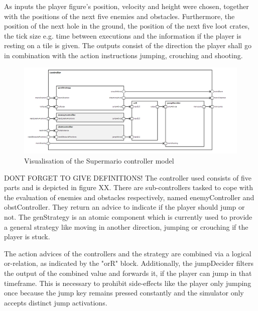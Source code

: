As inputs the player figure's position, velocity and height were chosen, together with the positions of the next five enemies and obstacles. Furthermore, the position of the next hole in the ground, the position of the next five loot crates, the tick size e.g. time between executions and the information if the player is resting on a tile is given.
The outputs consist of the direction the player shall go in combination with the action instructions jumping, crouching and shooting.

\begin{figure}
	\centering
	\includegraphics[scale=0.5]{pictures/haller_controller.PNG}
	\caption{Visualisation of the Supermario controller model}
	\label{fig:marioController}
\end{figure}

DONT FORGET TO GIVE DEFINITIONS!
The controller used consists of five parts and is depicted in figure XX. There are sub-controllers tasked to cope with the evaluation of enemies and obstacles respectively, named enemyController and obstController. They return an advice to indicate if the player should jump or not. The genStrategy is an atomic component which is currently used to provide a general strategy like moving in another direction, jumping or crouching if the player is stuck. 

The action advices of the controllers and the strategy are combined via a logical or-relation, as indicated by the "orR" block. Additionally, the jumpDecider filters the output of the combined value and forwards it, if the player can jump in that timeframe. This is necessary to prohibit side-effects like the player only jumping once because the jump key remains pressed constantly and the simulator only accepts distinct jump activations.


